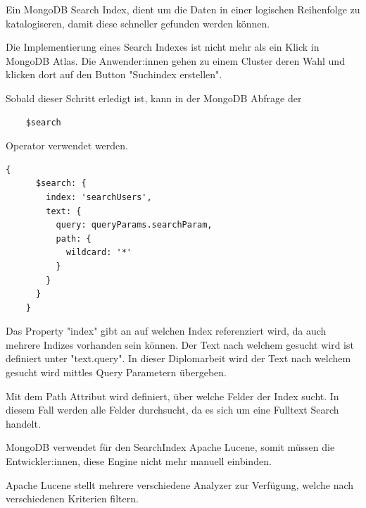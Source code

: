 Ein MongoDB Search Index, dient um die Daten in einer logischen Reihenfolge zu katalogiseren, damit diese schneller gefunden werden können.

Die Implementierung eines Search Indexes ist nicht mehr als ein Klick in MongoDB Atlas. Die Anwender:innen gehen zu einem Cluster deren Wahl und klicken dort auf den Button "Suchindex erstellen".

Sobald dieser Schritt erledigt ist, kann in der MongoDB Abfrage der 

\begin{lstlisting}
    $search 
\end{lstlisting}

Operator verwendet werden.

\begin{lstlisting}[caption=Implementierung Full-Text-Search]
    {
      $search: {
        index: 'searchUsers',
        text: {
          query: queryParams.searchParam,
          path: {
            wildcard: '*'
          }
        }
      }
    }
\end{lstlisting}

Das Property "index" gibt an auf welchen Index referenziert wird, da auch mehrere Indizes vorhanden sein können. 
Der Text nach welchem gesucht wird ist definiert unter "text.query". In dieser Diplomarbeit wird der Text nach welchem gesucht wird mittles Query Parametern übergeben. 

Mit dem Path Attribut wird definiert, über welche Felder der Index sucht. In diesem Fall werden alle Felder durchsucht, da es sich um eine Fulltext Search handelt.

MongoDB verwendet für den SearchIndex Apache Lucene, somit müssen die Entwickler:innen, diese Engine nicht mehr manuell einbinden. 

Apache Lucene stellt mehrere verschiedene Analyzer zur Verfügung, welche nach verschiedenen Kriterien filtern.

